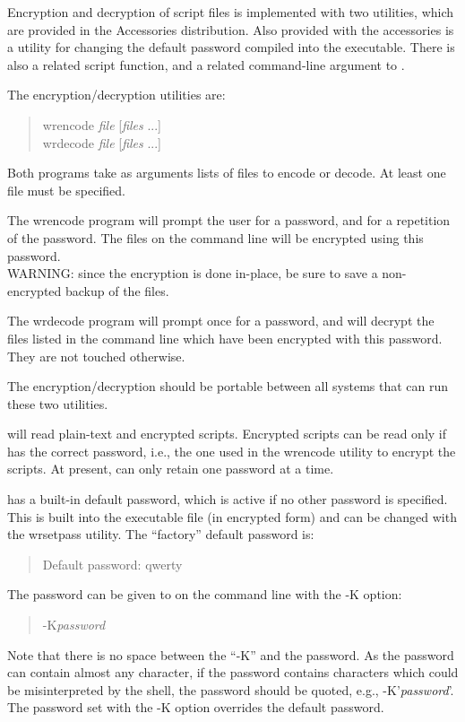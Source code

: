 Encryption and decryption of script files is implemented with two
utilities, which are provided in the Accessories distribution.  Also
provided with the accessories is a utility for changing the default
password compiled into the {\Xic} executable.  There is also a related
script function, and a related command-line argument to {\Xic}.

The encryption/decryption utilities are:
\begin{quote}
{\vt wrencode} {\it file} [{\it files} ...]\\
{\vt wrdecode} {\it file} [{\it files} ...]
\end{quote}

Both programs take as arguments lists of files to encode or decode. 
At least one file must be specified.

The {\vt wrencode} program will prompt the user for a password, and
for a repetition of the password.  The files on the command line will
be encrypted using this password.\\
{\cb WARNING}:  since the encryption is done in-place, be sure to save
a non-encrypted backup of the files.

The {\vt wrdecode} program will prompt once for a password, and will
decrypt the files listed in the command line which have been encrypted
with this password.  They are not touched otherwise.

The encryption/decryption should be portable between all systems that
can run these two utilities.

{\Xic} will read plain-text and encrypted scripts.  Encrypted scripts
can be read only if {\Xic} has the correct password, i.e., the one
used in the {\vt wrencode} utility to encrypt the scripts.  At
present, {\Xic} can only retain one password at a time.

{\Xic} has a built-in default password, which is active if no other
password is specified.  This is built into the {\Xic} executable file
(in encrypted form) and can be changed with the {\vt wrsetpass}
utility.  The ``factory'' default password is:
\begin{quote}
Default password: {\vt qwerty}
\end{quote}

The password can be given to {\Xic} on the command line with the {\vt
-K} option:
\begin{quote}
{\vt -K}{\it password}
\end{quote}
Note that there is no space between the ``{\vt -K}'' and the password. 
As the password can contain almost any character, if the password
contains characters which could be misinterpreted by the shell, the
password should be quoted, e.g., {\vt -K'}{\it password}{\vt '}.  The
password set with the {\vt -K} option overrides the default password.


